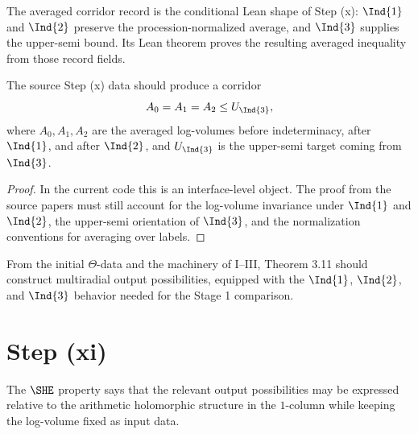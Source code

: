 \begin{definition}
  \label{def:step-x-averaged-corridor-record}
  \leanok
  The averaged corridor record is the conditional Lean shape of Step (x):
  \(\Ind{1}\) and \(\Ind{2}\) preserve the procession-normalized average, and
  \(\Ind{3}\) supplies the upper-semi bound.  Its Lean theorem proves the
  resulting averaged inequality from those record fields.
\end{definition}

\begin{proposition}
  \label{prop:step-x-corridor}
  \notready
  The source Step (x) data should produce a corridor
  \[
    A_0 = A_1 = A_2 \le U_{\Ind{3}},
  \]
  where \(A_0,A_1,A_2\) are the averaged log-volumes before
  indeterminacy, after \(\Ind{1}\), and after \(\Ind{2}\), and
  \(U_{\Ind{3}}\) is the upper-semi target coming from \(\Ind{3}\).
\end{proposition}

\begin{proof}
  In the current code this is an interface-level object.  The proof from the
  source papers must still account for the log-volume invariance under
  \(\Ind{1}\) and \(\Ind{2}\), the upper-semi orientation of \(\Ind{3}\), and
  the normalization conventions for averaging over labels.
\end{proof}

\begin{theorem}
  \label{thm:theorem-311-source-output}
  \notready
  From the initial \(\Theta\)-data and the machinery of \IUT{} I--III,
  Theorem 3.11 should construct multiradial output possibilities, equipped
  with the \(\Ind{1}\), \(\Ind{2}\), and \(\Ind{3}\) behavior needed for
  the Stage 1 comparison.
\end{theorem}

\section{Step (xi)}

\begin{definition}
  \label{def:she}
  \notready
  The \(\SHE\) property says that the relevant output possibilities may be
  expressed relative to the arithmetic holomorphic structure in the \(1\)-column
  while keeping the \qPilot{} log-volume fixed as input data.
\end{definition}

